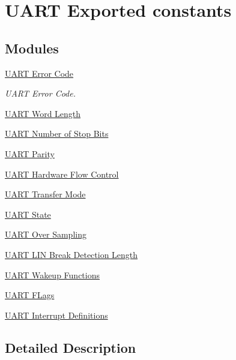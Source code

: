 \hypertarget{group___u_a_r_t___exported___constants}{}\section{U\+A\+RT Exported constants}
\label{group___u_a_r_t___exported___constants}
\subsection*{Modules}
\begin{DoxyCompactItemize}
\item 
\hyperlink{group___u_a_r_t___error___code}{U\+A\+R\+T Error Code}
\begin{DoxyCompactList}\small\item\em U\+A\+RT Error Code. \end{DoxyCompactList}\item 
\hyperlink{group___u_a_r_t___word___length}{U\+A\+R\+T Word Length}
\item 
\hyperlink{group___u_a_r_t___stop___bits}{U\+A\+R\+T Number of Stop Bits}
\item 
\hyperlink{group___u_a_r_t___parity}{U\+A\+R\+T Parity}
\item 
\hyperlink{group___u_a_r_t___hardware___flow___control}{U\+A\+R\+T Hardware Flow Control}
\item 
\hyperlink{group___u_a_r_t___mode}{U\+A\+R\+T Transfer Mode}
\item 
\hyperlink{group___u_a_r_t___state}{U\+A\+R\+T State}
\item 
\hyperlink{group___u_a_r_t___over___sampling}{U\+A\+R\+T Over Sampling}
\item 
\hyperlink{group___u_a_r_t___l_i_n___break___detection___length}{U\+A\+R\+T L\+I\+N Break Detection Length}
\item 
\hyperlink{group___u_a_r_t___wake_up__functions}{U\+A\+R\+T Wakeup Functions}
\item 
\hyperlink{group___u_a_r_t___flags}{U\+A\+R\+T F\+Lags}
\item 
\hyperlink{group___u_a_r_t___interrupt__definition}{U\+A\+R\+T Interrupt Definitions}
\end{DoxyCompactItemize}


\subsection{Detailed Description}
